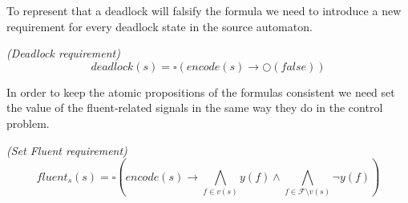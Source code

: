 To represent that a deadlock will falsify the formula
we need to introduce a new requirement for every deadlock state
in the source automaton.

\begin{definition}\label{def:deadlock-state}\emph{(Deadlock requirement)}
\[deadlock(s) = \square(encode(s) \rightarrow \Circle(false)) \]
\end{definition}

In order to keep the atomic propositions of the formulas consistent
we need set the value of the fluent-related signals in the
same way they do in the control problem.

\begin{definition}\label{def:fluent-set}\emph{(Set Fluent requirement)}\\
\[fluent_s(s) = \square(encode(s) \rightarrow \bigwedge_{f \in v(s)} y(f) \wedge \bigwedge_{f \in \mathcal{F} \setminus v(s)}\neg y(f)) \]

\end{definition}


